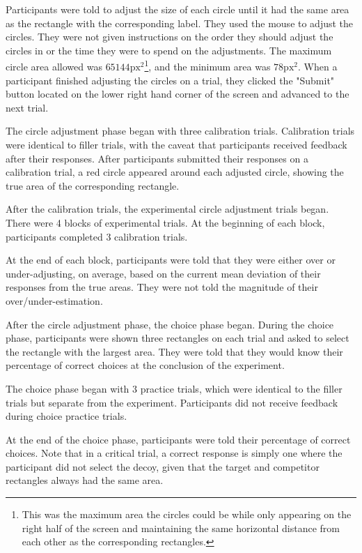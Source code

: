 Participants were told to adjust the size of each circle until it had the same area as the rectangle with the corresponding label. They used the mouse to adjust the circles. They were not given instructions on the order they should adjust the circles in or the time they were to spend on the adjustments. The maximum circle area allowed was $65144 \text{px}^2$\footnote{This was the maximum area the circles could be while only appearing on the right half of the screen and maintaining the same horizontal distance from each other as the corresponding rectangles.}, and the minimum area was $78 \text{px}^2$. When a participant finished adjusting the circles on a trial, they clicked the "Submit" button located on the lower right hand corner of the screen and advanced to the next trial. 

The circle adjustment phase began with three calibration trials. Calibration trials were identical to filler trials, with the caveat that participants received feedback after their responses. After participants submitted their responses on a calibration trial, a red circle appeared around each adjusted circle, showing the true area of the corresponding rectangle.  

After the calibration trials, the experimental circle adjustment trials began. There were 4 blocks of experimental trials. At the beginning of each block, participants completed $3$ calibration trials. 

At the end of each block, participants were told that they were either over or under-adjusting, on average, based on the current mean deviation of their responses from the true areas. They were not told the magnitude of their over/under-estimation.

After the circle adjustment phase, the choice phase began. During the choice phase, participants were shown three rectangles on each trial and asked to select the rectangle with the largest area. They were told that they would know their percentage of correct choices at the conclusion of the experiment.

The choice phase began with $3$ practice trials, which were identical to the filler trials but separate from the experiment. Participants did not receive feedback during choice practice trials. 

At the end of the choice phase, participants were told their percentage of correct choices. Note that in a critical trial, a correct response is simply one where the participant did not select the decoy, given that the target and competitor rectangles always had the same area.

